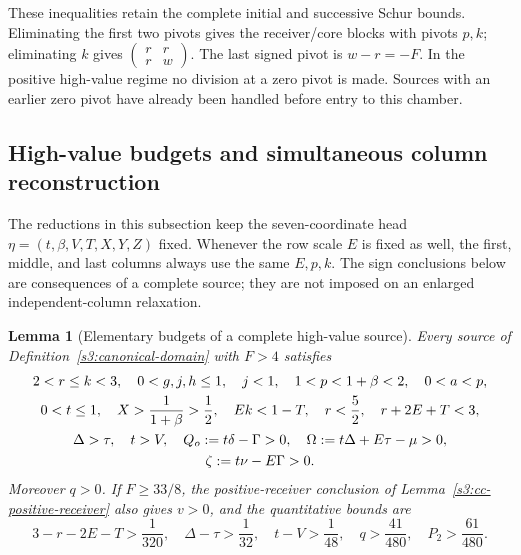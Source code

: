 \documentclass[11pt,reqno]{amsart}
\newtheorem{lemma}[theorem]{Lemma}
\theoremstyle{definition}
\theoremstyle{remark}
\begin{document}
These inequalities retain the complete initial and successive Schur
bounds. Eliminating the first two pivots gives the receiver/core blocks
with pivots \(p,k\); eliminating \(k\) gives
\(\left(\begin{smallmatrix}r&r\\r&w\end{smallmatrix}\right)\).
The last signed pivot is \(w-r=-F\). In the positive high-value
regime no division at a zero pivot is made. Sources with an earlier
zero pivot have already been handled before entry to this chamber.

\subsection{High-value budgets and simultaneous column reconstruction}
\label{s3:cc-reconstruction}

The reductions in this subsection keep the seven-coordinate head
\(\eta=(t,\beta,V,T,X,Y,Z)\) fixed. Whenever the row scale \(E\)
is fixed as well, the first, middle, and last columns always use the
same \(E,p,k\). The sign conclusions below are consequences of a
complete source; they are not imposed on an enlarged independent-column
relaxation.

\begin{lemma}[Elementary budgets of a complete high-value source]
\label{s3:cc-budgets}
Every source of Definition~\ref{s3:canonical-domain} with \(F>4\)
satisfies
\begin{gather}
 2<r\le k<3,\quad 0<g,j,h\le1,\quad j<1,
 \quad1<p<1+\beta<2,\quad0<a<p,\label{s3:cc-basic-budget}\\
 0<t\le1,\quad X>\frac1{1+\beta}>\frac12,\quad
 Ek<1-T,\quad r<\frac52,\quad r+2E+T<3,
 \label{s3:cc-scale-budget}\\
 \Delta>\tau,\quad t>V,\quad
 Q_o:=t\delta-\Gamma>0,\quad
 \Omega:=t\Delta+E\tau-\mu>0,\notag\\
 \zeta:=t\nu-E\Gamma>0.\label{s3:cc-directions}
\end{gather}
Moreover \(q>0\). If \(F\ge33/8\), the positive-receiver
conclusion of Lemma~\ref{s3:cc-positive-receiver} also gives
\(v>0\), and the quantitative bounds are
\begin{equation}\label{s3:cc-quantitative-budgets}
 3-r-2E-T>\frac1{320},\quad
 \Delta-\tau>\frac1{32},\quad t-V>\frac1{48},\quad
 q>\frac{41}{480},\quad P_2>\frac{61}{480}.
\end{equation}
\end{lemma}
\end{document}
